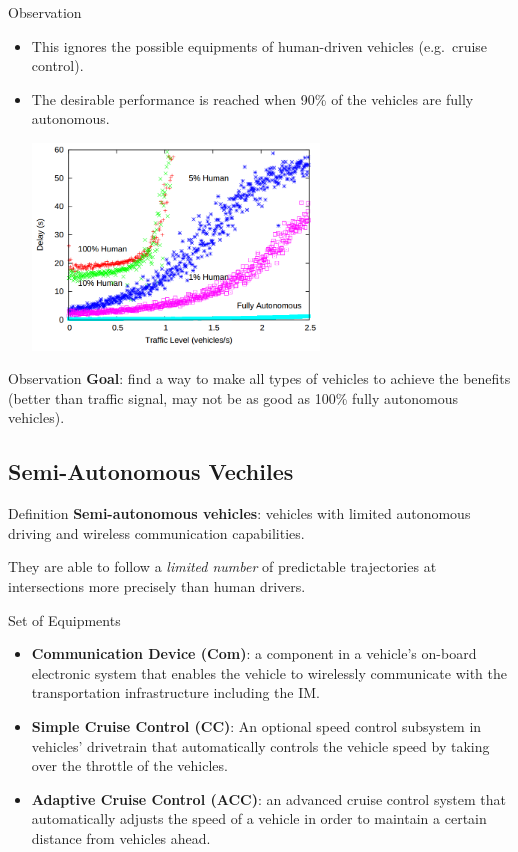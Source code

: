 \documentclass{beamer}
\newcommand{\goal}{find a way to make all types of vehicles to
achieve the benefits (better than traffic signal, may not be as good
as 100\% fully autonomous vehicles)}
\begin{document}
\begin{frame}{Observation}
\begin{itemize}
\item This ignores the possible equipments of human-driven vehicles
(e.g.\ cruise control).
\item The desirable performance is reached when 90\% of the vehicles
are fully autonomous.\pause

\includegraphics[width=0.6\textwidth]{bad_human.png}
\end{itemize}
\end{frame}

\begin{frame}{Observation}
\textbf{Goal}: \goal.
\end{frame}

\subsection{Semi-Autonomous Vechiles}

\begin{frame}{Definition}
\textbf{Semi-autonomous vehicles}: vehicles with limited autonomous
driving and wireless communication capabilities.\pause

\hfill

They are able to follow a \textit{limited number} of predictable
trajectories at intersections more precisely than human drivers.
\end{frame}

\begin{frame}{Set of Equipments}
\begin{itemize}
\item \textbf{Communication Device (Com)}:
a component in a vehicle's on-board electronic system that enables the
vehicle to wirelessly communicate with the transportation
infrastructure including the IM.\pause
\item \textbf{Simple Cruise Control (CC)}:
An optional speed control subsystem in vehicles' drivetrain that
automatically controls the vehicle speed by taking over the throttle
of the vehicles.\pause
\item \textbf{Adaptive Cruise Control (ACC)}:
an advanced cruise control system that automatically adjusts the speed
of a vehicle in order to maintain a certain distance from vehicles
ahead.
\end{itemize}
\end{frame}
\end{document}
